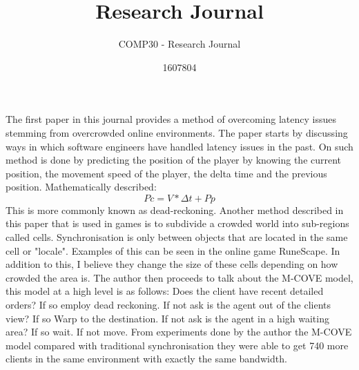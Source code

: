 \documentclass{scrartcl}
\title{Research Journal}
\subtitle{COMP30 - Research Journal}
\author{1607804}
\begin{document}
\maketitle

\section{}


The first paper in this journal \cite {parker2008novel}provides a method of overcoming latency \cite{claypool2006latency} issues stemming from overcrowded online environments. The paper starts by discussing ways in which software engineers have handled latency issues in the past. On such method is done by predicting the position of the player by knowing the current position, the movement speed of the player, the delta time and the previous position\cite{li2007method}. Mathematically described:\begin{equation} Pc = V * \Delta t + Pp \end{equation} This is more commonly known as dead-reckoning. 
Another method described in this paper that is used in games is to subdivide a crowded world into sub-regions called cells. Synchronisation is only between objects that are located in the same cell or "locale"\cite {barrus1996locales}. Examples of this can be seen in the online game RuneScape\cite {Runescape}. In addition to this, I believe they change the size of these cells depending on how crowded the area is. The author then proceeds to talk about the M-COVE model, this model at a high level is as follows: Does the client have recent detailed orders? If so employ dead reckoning. If not ask is the agent out of the clients view? If so Warp to the destination. If not ask is the agent in a high waiting area? If so wait. If not move. From experiments done by the author the M-COVE model compared with traditional synchronisation  they were able to get 740 more clients in the same environment with exactly the same bandwidth. 
\end{document}
